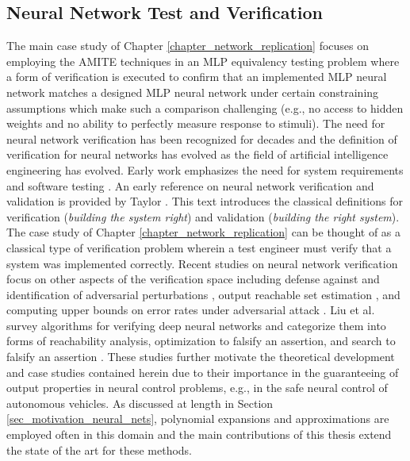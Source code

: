 \subsection{Neural Network Test and Verification}
The main case study of Chapter \ref{chapter_network_replication} focuses on employing the AMITE techniques in an MLP equivalency testing problem where a form of verification is executed to confirm that an implemented MLP neural network matches a designed MLP neural network under certain constraining assumptions which make such a comparison challenging (e.g., no access to hidden weights and no ability to perfectly measure response to stimuli).  The need for neural network verification has been recognized for decades \cite{peterson_foundation_1993} and the definition of verification for neural networks has evolved as the field of artificial intelligence engineering has evolved.  Early work emphasizes the need for system requirements and software testing \cite{schumann_verification_2003,gupta_tool_2004}. An early reference on neural network verification and validation is provided by Taylor \cite{taylor_methods_2006}.  This text introduces the classical definitions for verification (\emph{building the system right}) and validation (\emph{building the right system}).  The case study of Chapter \ref{chapter_network_replication}
can be thought of as a classical type of verification problem wherein a test engineer must verify that a system was implemented correctly.  Recent studies on neural network verification focus on other aspects of the verification space including defense against and identification of adversarial perturbations \cite{darvish_rouani_safe_2019,venzke_verification_2020}, output
reachable set estimation \cite{xiang_output_2018}, and computing
upper bounds on error rates under adversarial attack
\cite{dvijotham_efficient_2019}.  Liu et al. survey
algorithms for verifying deep neural networks and
categorize them into forms of reachability analysis, optimization
to falsify an assertion, and search to falsify an assertion
\cite{liu_Algorithms_2019}.  These studies further motivate the theoretical development and case studies contained herein due to their importance in the guaranteeing of output properties in neural control problems, e.g., in the safe neural control of autonomous vehicles.  As discussed at length in Section \ref{sec_motivation_neural_nets}, polynomial expansions and approximations are employed often in this domain and the main contributions of this thesis extend the state of the art for these methods.

